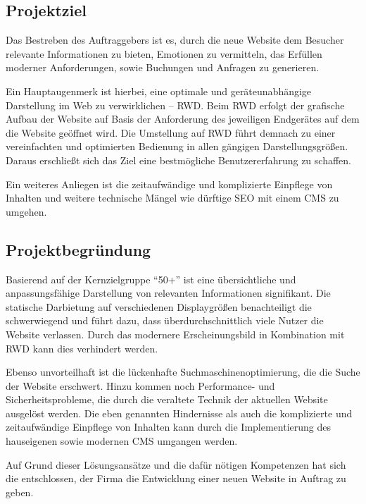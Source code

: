 \subsection{Projektziel} 
\label{sec:Projektziel}

Das Bestreben des Auftraggebers ist es, durch die neue Website dem Besucher
relevante Informationen zu bieten, Emotionen zu vermitteln, das Erfüllen
moderner Anforderungen, sowie Buchungen und Anfragen zu generieren.

Ein Hauptaugenmerk ist hierbei, eine optimale und geräteunabhängige Darstellung
im Web zu verwirklichen -- \ac{RWD}. Beim \ac{RWD} erfolgt der
grafische Aufbau der Website auf Basis der Anforderung des jeweiligen Endgerätes
auf dem die Website geöffnet wird. Die Umstellung auf \ac{RWD} führt demnach
zu einer vereinfachten und optimierten Bedienung in allen gängigen
Darstellungsgrößen. Daraus erschließt sich das Ziel eine bestmögliche
Benutzererfahrung zu schaffen.

Ein weiteres Anliegen ist die zeitaufwändige und komplizierte Einpflege von
Inhalten und weitere technische Mängel wie \zB dürftige \ac{SEO} mit einem
\ac{CMS} zu umgehen.


\subsection{Projektbegründung} 
\label{sec:Projektbegruendung}
Basierend auf der Kernzielgruppe "`50+"' ist eine übersichtliche und
anpassungsfähige Darstellung von relevanten Informationen signifikant. 
Die statische Darbietung auf verschiedenen Displaygrößen benachteiligt die
 schwerwiegend und führt dazu, dass
überdurchschnittlich viele Nutzer die Website verlassen. Durch das modernere
Erscheinungsbild in Kombination mit \ac{RWD} kann dies verhindert werden.
 
Ebenso unvorteilhaft ist die lückenhafte Suchmaschinenoptimierung, die die Suche
der Website erschwert. Hinzu kommen noch Performance- und
Sicherheitsprobleme, die durch die veraltete Technik der aktuellen Website
ausgelöst werden. Die eben genannten Hindernisse als auch die komplizierte und
zeitaufwändige Einpflege von Inhalten kann durch die Implementierung des
hauseigenen sowie modernen \ac{CMS} \ct umgangen werden.

Auf Grund dieser Lösungsansätze und die dafür nötigen Kompetenzen hat sich die
\kunde entschlossen, der Firma \mh die Entwicklung einer neuen Website in
Auftrag zu geben.
